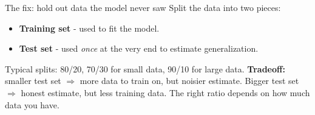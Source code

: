 \documentclass[aspectratio=169]{beamer}
\begin{document}
\begin{frame}{The fix: hold out data the model never saw}
  Split the data into two pieces:
  \begin{itemize}
    \item \textbf{Training set} - used to fit the model.
    \item \textbf{Test set} - used \emph{once} at the very end to estimate generalization.
  \end{itemize}
  \vfill
  \begin{center}
  \end{center}
  \vfill
  Typical splits: 80/20, 70/30 for small data, 90/10 for large data.
  \vfill
  \textbf{Tradeoff:} smaller test set $\Rightarrow$ more data to train on, but noisier estimate. Bigger test set $\Rightarrow$ honest estimate, but less training data. The right ratio depends on how much data you have.
\end{frame}
\end{document}
